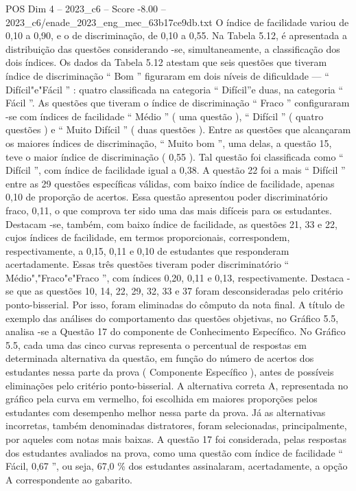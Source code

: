 \begin{textsample}{POS Dim 4 – 2023\_c6 – Score -8.00 – 2023\_c6/enade\_2023\_eng\_mec\_63b17ce9db.txt}
O índice de facilidade variou de 0,10 a 0,90, e o de discriminação, de 0,10 a 0,55.
Na Tabela 5.12, é apresentada a distribuição das questões considerando -se, simultaneamente, a classificação dos dois índices.
Os dados da Tabela 5.12 atestam que seis questões que tiveram índice de discriminação “ Bom ” figuraram em dois níveis de dificuldade — “ Difícil"e"Fácil ” : quatro classificada na categoria “ Difícil”e duas, na categoria “ Fácil ”.
As questões que tiveram o índice de discriminação “ Fraco ” configuraram -se com índices de facilidade “ Médio ” ( uma questão ), “ Difícil ” ( quatro questões ) e “ Muito Difícil ” ( duas questões ).
Entre as questões que alcançaram os maiores índices de discriminação, “ Muito bom ”, uma delas, a questão 15, teve o maior índice de discriminação ( 0,55 ).
Tal questão foi classificada como “ Difícil ”, com índice de facilidade igual a 0,38.
A questão 22 foi a mais “ Difícil ” entre as 29 questões específicas válidas, com baixo índice de facilidade, apenas 0,10 de proporção de acertos.
Essa questão apresentou poder discriminatório fraco, 0,11, o que comprova ter sido uma das mais difíceis para os estudantes.
Destacam -se, também, com baixo índice de facilidade, as questões 21, 33 e 22, cujos índices de facilidade, em termos proporcionais, correspondem, respectivamente, a 0,15, 0,11 e 0,10 de estudantes que responderam acertadamente.
Essas três questões tiveram poder discriminatório “ Médio","Fraco"e"Fraco ”, com índices 0,20, 0,11 e 0,13, respectivamente.
Destaca -se que as questões 10, 14, 22, 29, 32, 33 e 37 foram desconsideradas pelo critério ponto-bisserial.
Por isso, foram eliminadas do cômputo da nota final.
A título de exemplo das análises do comportamento das questões objetivas, no Gráfico 5.5, analisa -se a Questão 17 do componente de Conhecimento Específico.
No Gráfico 5.5, cada uma das cinco curvas representa o percentual de respostas em determinada alternativa da questão, em função do número de acertos dos estudantes nessa parte da prova ( Componente Específico ), antes de possíveis eliminações pelo critério ponto-bisserial.
A alternativa correta A, representada no gráfico pela curva em vermelho, foi escolhida em maiores proporções pelos estudantes com desempenho melhor nessa parte da prova.
Já as alternativas incorretas, também denominadas distratores, foram selecionadas, principalmente, por aqueles com notas mais baixas.
A questão 17 foi considerada, pelas respostas dos estudantes avaliados na prova, como uma questão com índice de facilidade “ Fácil, 0,67 ”, ou seja, 67,0 \% dos estudantes assinalaram, acertadamente, a opção A correspondente ao gabarito.

\end{textsample}
